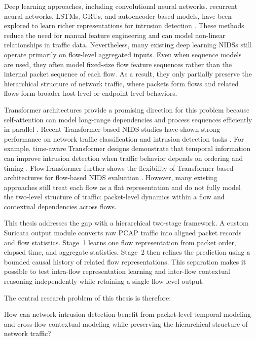 \documentclass[11pt,fleqn]{report}
\begin{document}
Deep learning approaches, including convolutional neural networks, recurrent neural networks, LSTMs, GRUs, and autoencoder-based models, have been explored to learn richer representations for intrusion detection \cite{Yin2017RNNIDS,Shone2018NNAE,Mirsky2018Kitsune}. These methods reduce the need for manual feature engineering and can model non-linear relationships in traffic data. Nevertheless, many existing deep learning NIDSs still operate primarily on flow-level aggregated inputs. Even when sequence models are used, they often model fixed-size flow feature sequences rather than the internal packet sequence of each flow. As a result, they only partially preserve the hierarchical structure of network traffic, where packets form flows and related flows form broader host-level or endpoint-level behaviors.

Transformer architectures provide a promising direction for this problem because self-attention can model long-range dependencies and process sequences efficiently in parallel \cite{Vaswani2017}. Recent Transformer-based NIDS studies have shown strong performance on network traffic classification and intrusion detection tasks \cite{Wu2022RTIDS,Han2023GTID,Manocchio2024FlowTransformer}. For example, time-aware Transformer designs demonstrate that temporal information can improve intrusion detection when traffic behavior depends on ordering and timing \cite{Han2023GTID}. FlowTransformer further shows the flexibility of Transformer-based architectures for flow-based NIDS evaluation \cite{Manocchio2024FlowTransformer}. However, many existing approaches still treat each flow as a flat representation and do not fully model the two-level structure of traffic: packet-level dynamics within a flow and contextual dependencies across flows.

This thesis addresses the gap with a hierarchical two-stage framework. A custom
Suricata output module converts raw PCAP traffic into aligned packet records and
flow statistics. Stage~1 learns one flow representation from packet order,
elapsed time, and aggregate statistics. Stage~2 then refines the prediction
using a bounded causal history of related flow representations. This separation
makes it possible to test intra-flow representation learning and inter-flow
contextual reasoning independently while retaining a single flow-level output.

The central research problem of this thesis is therefore:

\begin{displayquote}
How can network intrusion detection benefit from packet-level temporal modeling and cross-flow contextual modeling while preserving the hierarchical structure of network traffic?
\end{displayquote}
\end{document}
